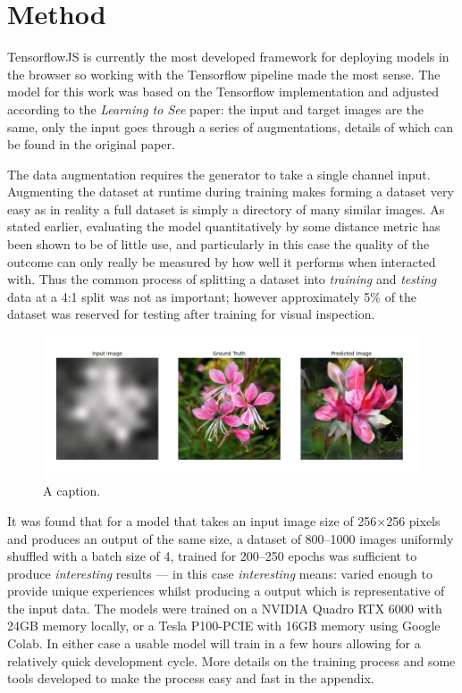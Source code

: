 \documentclass{article}
\begin{document}
\section{Method}
TensorflowJS is currently the most developed framework for deploying models in the browser so working with the Tensorflow pipeline made the most sense. The model for this work was based on the Tensorflow implementation\cite{tf_p2p} and adjusted according to the \textit{Learning to See} paper: the input and target images are the same, only the input goes through a series of augmentations, details of which can be found in the original paper\cite{2003.00902}.

The data augmentation requires the generator to take a single channel input. Augmenting the dataset at runtime during training makes forming a dataset very easy as in reality a full dataset is simply a directory of many similar images. As stated earlier, evaluating the model quantitatively by some distance metric has been shown to be of little use, and particularly in this case the quality of the outcome can only really be measured by how well it performs when interacted with. Thus the common process of splitting a dataset into \textit{training} and \textit{testing} data at a 4:1 split was not as important; however approximately 5\% of the dataset was reserved for testing after training for visual inspection.

\begin{figure}
	\centering
	\includegraphics[width=\textwidth]{250_epochs}
	\caption{A caption.}
\end{figure}

It was found that for a model that takes an input image size of 256$\times$256 pixels and produces an output of the same size, a dataset of 800--1000 images uniformly shuffled with a batch size of 4, trained for 200--250 epochs was sufficient to produce \textit{interesting} results --- in this case \textit{interesting} means: varied enough to provide unique experiences whilst producing a output which is representative of the input data. The models were trained on a NVIDIA Quadro RTX 6000 with 24GB memory locally, or a Tesla P100-PCIE with 16GB memory using Google Colab. In either case a usable model will train in a few hours allowing for a relatively quick development cycle. More details on the training process and some tools developed to make the process easy and fast in the appendix.
\end{document}
